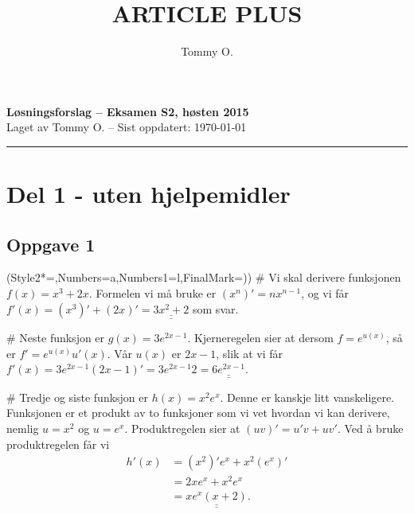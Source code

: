 \documentclass[12pt, a4paper]
{article}						%
\title{ARTICLE PLUS}
\author{Tommy O.}
\def\answer#1{\underline{\underline{#1}}}
\begin{document}
\pagestyle{fancy}
{\bfseries \Large Løsningsforslag -- Eksamen S2, høsten 2015} \\
{ \footnotesize Laget av Tommy O. -- Sist oppdatert: \today}
\hrule

\section*{Del 1 - uten hjelpemidler}
\subsection*{Oppgave 1}
\begin{easylist}[enumerate]
	\ListProperties(Style2*=,Numbers=a,Numbers1=l,FinalMark={)})
	# Vi skal derivere funksjonen $f(x) = x^3 + 2x$.
	Formelen vi må bruke er $(x^n)' = nx^{n-1}$, og vi får $f'(x) = \left(x^3\right)' + \left(2x\right)' = \answer{3x^2 + 2}$ som svar.

	# Neste funksjon er $g(x) = 3e^{2x-1}$.
	Kjerneregelen sier at dersom $f = e^{u(x)}$, så er $f' = e^{u(x)} u'(x)$.
	Vår $u(x)$ er $ 2x-1$, slik at vi får $f'(x) = 3e^{2x-1} (2x-1)' = 3e^{2x-1} 2 = \answer{6e^{2x-1}}$.
	
	# Tredje og siste funksjon er $h(x) = x^2e^x$.
	Denne er kanskje litt vanskeligere. Funksjonen er et produkt av to funksjoner som vi vet hvordan vi  kan derivere, nemlig $u = x^2$ og $u = e^x$.
	Produktregelen sier at $(uv)' = u'v + uv'$. Ved å bruke produktregelen får vi
	\begin{align*}
		h'(x) &= \left(x^2\right)'  e^x + x^2\left(e^x\right)' \\
			&= 2x  e^x + x^2e^x \\
			&= \answer{xe^x\left(x+2\right)}.
	\end{align*}
\end{easylist}
\end{document}

